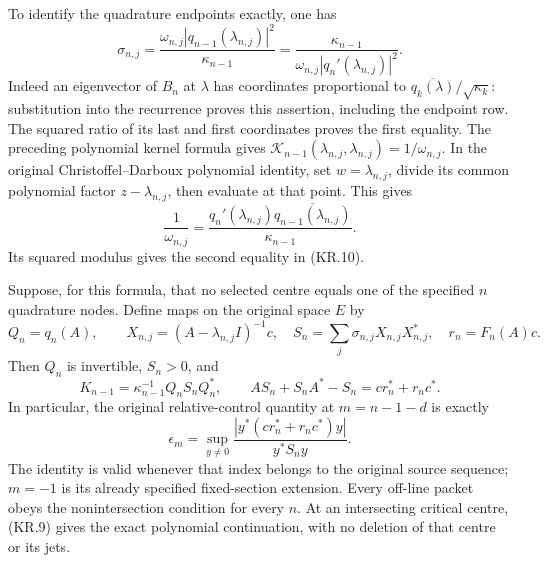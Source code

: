 To identify the quadrature endpoints exactly, one has
\[
 \sigma_{n,j}
   =\frac{\omega_{n,j}|q_{n-1}(\lambda_{n,j})|^2}
           {\kappa_{n-1}}
   =\frac{\kappa_{n-1}}
           {\omega_{n,j}|q_n'(\lambda_{n,j})|^2}.          \tag{KR.10}
\]
Indeed an eigenvector of \(B_n\) at \(\lambda\) has coordinates
proportional to
\(\overline{q_k(\lambda)}/\sqrt{\kappa_k}\): substitution into
the recurrence proves this assertion, including the endpoint row.
The squared ratio of its last and first coordinates proves the
first equality.  The preceding polynomial kernel formula gives
\(\mathcal K_{n-1}(\lambda_{n,j},\lambda_{n,j})=1/\omega_{n,j}\).
In the original Christoffel--Darboux polynomial identity, set
\(w=\lambda_{n,j}\), divide its common polynomial factor
\(z-\lambda_{n,j}\), then evaluate at that point.  This gives
\[
 \frac1{\omega_{n,j}}
  =\frac{q_n'(\lambda_{n,j})
           \overline{q_{n-1}(\lambda_{n,j})}}{\kappa_{n-1}}.
\]
Its squared modulus gives the second equality in (KR.10).

\begin{theorem}
Suppose, for this formula, that no selected centre equals one of
the specified \(n\) quadrature nodes.  Define maps on the original
space \(E\) by
\[
 Q_n=q_n(A),\qquad X_{n,j}=(A-\lambda_{n,j}I)^{-1}c,
 \quad S_n=\sum_j\sigma_{n,j}X_{n,j}X_{n,j}^*,
 \quad r_n=F_n(A)c.                                      \tag{KR.11}
\]
Then \(Q_n\) is invertible, \(S_n>0\), and
\[
 \boxed{K_{n-1}=\kappa_{n-1}^{-1}Q_nS_nQ_n^*,\qquad
 AS_n+S_nA^*-S_n=cr_n^*+r_nc^*.}                         \tag{KR.12}
\]
In particular, the original relative-control quantity at
\(m=n-1-d\) is exactly
\[
 \epsilon_m=
 \sup_{y\ne0}\frac{|y^*(cr_n^*+r_nc^*)y|}{y^*S_ny}.       \tag{KR.13}
\]
The identity is valid whenever that index belongs to the original
source sequence; \(m=-1\) is its already specified fixed-section
extension.  Every off-line packet obeys the nonintersection
condition for every \(n\).  At an intersecting critical centre,
(KR.9) gives the exact polynomial continuation, with no deletion
of that centre or its jets.
\end{theorem}

